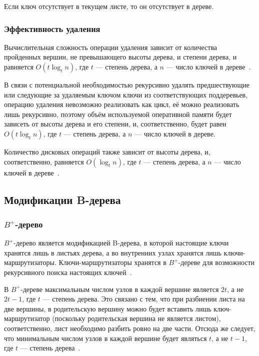 \documentclass[a4paper,12pt]{article}
\begin{document}
	Если ключ отсутствует в текущем листе, то он отсутствует в дереве.
	
	\subsubsection{Эффективность удаления}
	
	Вычислительная сложность операции удаления зависит от количества пройденных вершин, не превышающего высоты дерева, и степени дерева, и равняется $O(t\log_t n)$, где $t$ --- степень дерева, а $n$ --- число ключей в дереве~\cite{Kormen}.
	
	В связи с потенциальной необходимостью рекурсивно удалять предшествующие или следующие за удаляемым ключом ключи из соответствующих поддеревьев, операцию удаления невозможно реализовать как цикл, её можно реализовать лишь рекурсивно, поэтому объём используемой оперативной памяти будет зависеть от высоты дерева и его степени, и, соответственно, будет равен $O(t\log_t n)$, где $t$ --- степень дерева, а $n$ --- число ключей в дереве.
	
	Количество дисковых операций также зависит от высоты дерева, и, соответственно, равняется $O(\log_t n)$, где $t$ --- степень дерева, а $n$ --- число ключей в дереве~\cite{Kormen}.
	
	\subsection{Модификации B-дерева}
	
	\subsubsection{$B^+$-дерево}
	
	$B^+$-дерево является модификацией B-дерева, в которой настоящие ключи хранятся лишь в листьях дерева, а во внутренних узлах хранятся лишь ключи-маршрутизаторы. Ключи-маршрутизаторы хранятся в $B^+$-дереве для возможности рекурсивного поиска настоящих ключей~\cite{Kerttu}.
	
	В $B^+$-дереве максимальным числом узлов в каждой вершине является $2t$, а не $2t-1$, где $t$ --- степень дерева. Это связано с тем, что при разбиении листа на две вершины, в родительскую вершину можно будет вставить лишь ключ-маршрутизатор (поскольку родительская вершина не является листом), соответственно, лист необходимо разбить ровно на две части. Отсюда же следует, что минимальным числом узлов в каждой вершине будет являться $t$, а не $t-1$, где $t$ --- степень дерева~\cite{Kerttu}.
	
\end{document}
